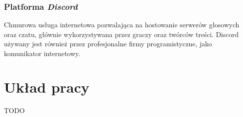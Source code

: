 \subsubsection{Platforma \textit{Discord}}

Chmurowa usługa internetowa pozwalająca na hostowanie serwerów głosowych oraz czatu, głównie wykorzystywana przez graczy oraz twórców treści. Discord używany jest również przez profesjonalne firmy programistyczne, jako komunikator internetowy.

\newpage

\section{Układ pracy}

TODO